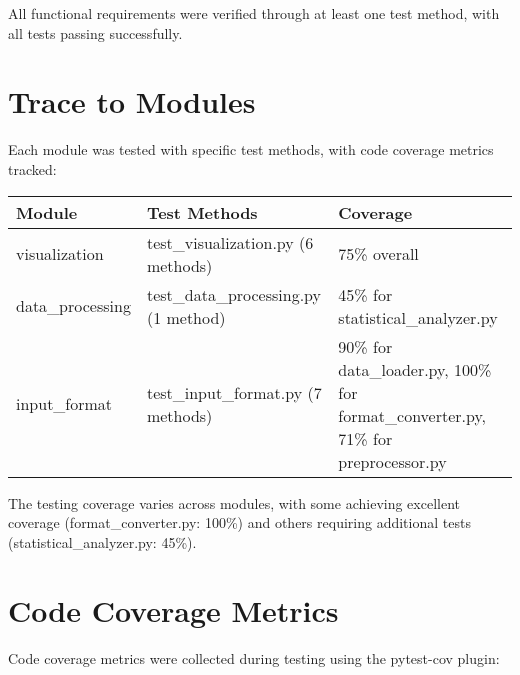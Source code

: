 \documentclass[12pt, titlepage]{article}
\begin{document}
All functional requirements were verified through at least one test method, with all tests passing successfully.

\section{Trace to Modules}		

Each module was tested with specific test methods, with code coverage metrics tracked:

\begin{tabularx}{\textwidth}{p{3cm}p{5cm}X}
\toprule {\bf Module} & {\bf Test Methods} & {\bf Coverage}\\
\midrule
visualization & test\_visualization.py (6 methods) & 75\% overall\\
data\_processing & test\_data\_processing.py (1 method) & 45\% for statistical\_analyzer.py\\
input\_format & test\_input\_format.py (7 methods) & 90\% for data\_loader.py, 100\% for format\_converter.py, 71\% for preprocessor.py\\
\bottomrule
\end{tabularx}

The testing coverage varies across modules, with some achieving excellent coverage (format\_converter.py: 100\%) and others requiring additional tests (statistical\_analyzer.py: 45\%).

\section{Code Coverage Metrics}

Code coverage metrics were collected during testing using the pytest-cov plugin:
\end{document}
